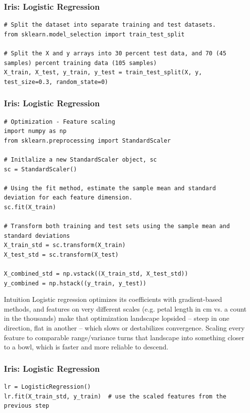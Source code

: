 \begin{frame}[fragile]\frametitle{Iris: Logistic Regression}
\begin{lstlisting}
# Split the dataset into separate training and test datasets.
from sklearn.model_selection import train_test_split

# Split the X and y arrays into 30 percent test data, and 70 (45 samples) percent training data (105 samples)
X_train, X_test, y_train, y_test = train_test_split(X, y, test_size=0.3, random_state=0)
\end{lstlisting}

\end{frame}

\begin{frame}[fragile]\frametitle{Iris: Logistic Regression}
\begin{lstlisting}
# Optimization - Feature scaling
import numpy as np
from sklearn.preprocessing import StandardScaler

# Initlalize a new StandardScaler object, sc
sc = StandardScaler()

# Using the fit method, estimate the sample mean and standard deviation for each feature dimension. 
sc.fit(X_train)

# Transform both training and test sets using the sample mean and standard deviations
X_train_std = sc.transform(X_train)
X_test_std = sc.transform(X_test)

X_combined_std = np.vstack((X_train_std, X_test_std))
y_combined = np.hstack((y_train, y_test))
\end{lstlisting}

\begin{block}{Intuition}
Logistic regression optimizes its coefficients with gradient-based methods, and features on very different scales (e.g. petal length in cm vs. a count in the thousands) make that optimization landscape lopsided -- steep in one direction, flat in another -- which slows or destabilizes convergence. Scaling every feature to comparable range/variance turns that landscape into something closer to a bowl, which is faster and more reliable to descend.
\end{block}

\end{frame}

\begin{frame}[fragile]\frametitle{Iris: Logistic Regression}
\begin{lstlisting}
lr = LogisticRegression()
lr.fit(X_train_std, y_train)  # use the scaled features from the previous step

\end{lstlisting}

\end{frame}


